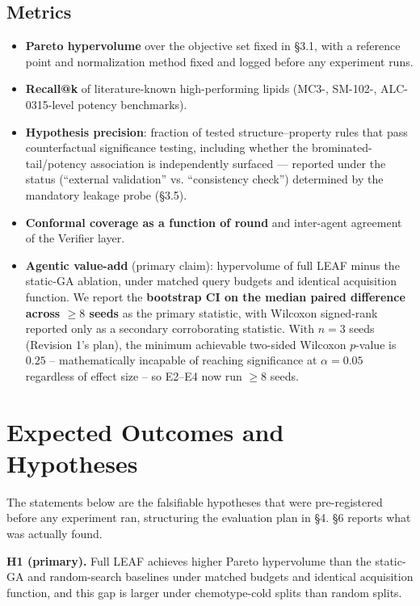 \documentclass{article}
\begin{document}
\subsection{Metrics}

\begin{itemize}
\item \textbf{Pareto hypervolume} over the objective set fixed in \S3.1,
with a reference point and normalization method fixed and logged before
any experiment runs.
\item \textbf{Recall@k} of literature-known high-performing lipids
(MC3-, SM-102-, ALC-0315-level potency benchmarks).
\item \textbf{Hypothesis precision}: fraction of tested structure--property
rules that pass counterfactual significance testing, including whether the
brominated-tail/potency association is independently surfaced --- reported
under the status (``external validation'' vs. ``consistency check'')
determined by the mandatory leakage probe (\S3.5).
\item \textbf{Conformal coverage as a function of round} and inter-agent
agreement of the Verifier layer.
\item \textbf{Agentic value-add} (primary claim): hypervolume of full LEAF
minus the static-GA ablation, under matched query budgets and identical
acquisition function. We report the \textbf{bootstrap CI on the median
paired difference across $\ge 8$ seeds} as the primary statistic, with
Wilcoxon signed-rank reported only as a secondary corroborating statistic.
With $n=3$ seeds (Revision 1's plan), the minimum achievable two-sided
Wilcoxon $p$-value is $0.25$ -- mathematically incapable of reaching
significance at $\alpha=0.05$ regardless of effect size -- so E2--E4 now
run $\ge 8$ seeds.
\end{itemize}

\section{Expected Outcomes and Hypotheses}

The statements below are the falsifiable hypotheses that were
pre-registered before any experiment ran, structuring the evaluation plan
in \S4. \S6 reports what was actually found.

\textbf{H1 (primary).} Full LEAF achieves higher Pareto hypervolume than
the static-GA and random-search baselines under matched budgets and
identical acquisition function, and this gap is larger under
chemotype-cold splits than random splits.
\end{document}
